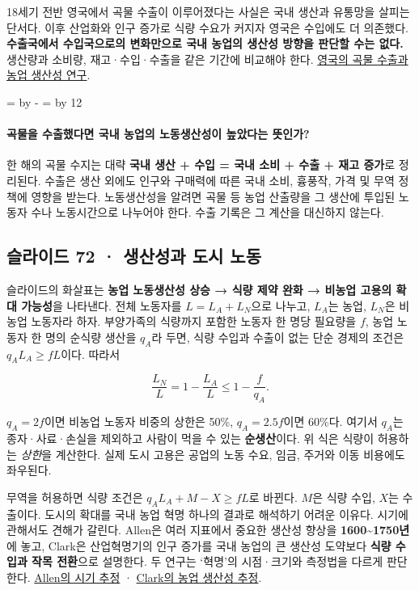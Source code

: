 \documentclass[10pt,a4paper]{article}
\newcommand{\ReserveQuestionSpace}{%
  \par\begingroup
  \dimen0=\pagegoal \advance\dimen0 by -\pagetotal
  \dimen2=\baselineskip \multiply\dimen2 by 12
  \ifdim\dimen0<\dimen2 \newpage\fi
  \endgroup}
\begin{document}
18세기 전반 영국에서 곡물 수출이 이루어졌다는 사실은 국내 생산과 유통망을 살피는 단서다. 이후 산업화와 인구 증가로 식량 수요가 커지자 영국은 수입에도 더 의존했다. \textbf{수출국에서 수입국으로의 변화만으로 국내 농업의 생산성 방향을 판단할 수는 없다.} 생산량과 소비량, 재고·수입·수출을 같은 기간에 비교해야 한다. \href{https://ora.ox.ac.uk/objects/uuid\%3Aa98a3874-436f-4725-b9c9-19306d86ed83/files/mf2d810f625d1adb4b3e7bee9afe19c79}{영국의 곡물 수출과 농업 생산성 연구}.\par

\ReserveQuestionSpace
\paragraph{곡물을 수출했다면 국내 농업의 노동생산성이 높았다는 뜻인가?}
한 해의 곡물 수지는 대략 \textbf{국내 생산 + 수입 = 국내 소비 + 수출 + 재고 증가}로 정리된다. 수출은 생산 외에도 인구와 구매력에 따른 국내 소비, 흉풍작, 가격 및 무역 정책에 영향을 받는다. 노동생산성을 알려면 곡물 등 농업 산출량을 그 생산에 투입된 노동자 수나 노동시간으로 나누어야 한다. 수출 기록은 그 계산을 대신하지 않는다.\par

\subsection{슬라이드 72 · 생산성과 도시 노동}
슬라이드의 화살표는 \textbf{농업 노동생산성 상승 → 식량 제약 완화 → 비농업 고용의 확대 가능성}을 나타낸다. 전체 노동자를 $L=L_A+L_N$으로 나누고, $L_A$는 농업, $L_N$은 비농업 노동자라 하자. 부양가족의 식량까지 포함한 노동자 한 명당 필요량을 $f$, 농업 노동자 한 명의 순식량 생산을 $q_A$라 두면, 식량 수입과 수출이 없는 단순 경제의 조건은 $q_A L_A\geq fL$이다. 따라서\par

\[
\frac{L_N}{L}=1-\frac{L_A}{L}\leq 1-\frac{f}{q_A}.
\]

$q_A=2f$이면 비농업 노동자 비중의 상한은 50\%, $q_A=2.5f$이면 60\%다. 여기서 $q_A$는 종자·사료·손실을 제외하고 사람이 먹을 수 있는 \textbf{순생산}이다. 위 식은 식량이 허용하는 \emph{상한}을 계산한다. 실제 도시 고용은 공업의 노동 수요, 임금, 주거와 이동 비용에도 좌우된다.\par

무역을 허용하면 식량 조건은 $q_A L_A+M-X\geq fL$로 바뀐다. $M$은 식량 수입, $X$는 수출이다. 도시의 확대를 국내 농업 혁명 하나의 결과로 해석하기 어려운 이유다. 시기에 관해서도 견해가 갈린다. Allen은 여러 지표에서 중요한 생산성 향상을 \textbf{1600\textasciitilde{}1750년}에 놓고, Clark은 산업혁명기의 인구 증가를 국내 농업의 큰 생산성 도약보다 \textbf{식량 수입과 작목 전환}으로 설명한다. 두 연구는 ‘혁명’의 시점·크기와 측정법을 다르게 판단한다. \href{https://ora.ox.ac.uk/objects/uuid\%3Af0df3e20-026b-4086-9f24-eac653219aba}{Allen의 시기 추정} · \href{https://faculty.econ.ucdavis.edu/faculty/gclark/papers/prod2002.pdf}{Clark의 농업 생산성 추정}.\par
\end{document}

